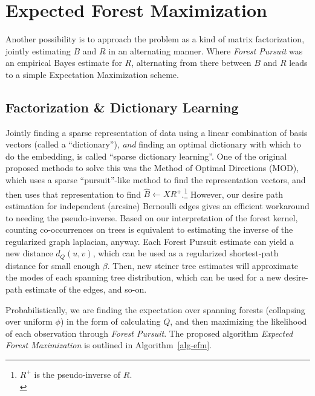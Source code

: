 \documentclass[%
	12pt,
		oneside,
		letterpaper
]{book}
\begin{document}
\section{Expected Forest Maximization}\label{expected-forest-maximization}

Another possibility is to approach the problem as a kind of matrix factorization, jointly estimating \(B\) and \(R\) in an alternating manner.
Where \emph{Forest Pursuit} was an empirical Bayes estimate for \(R\), alternating from there between \(B\) and \(R\) leads to a simple Expectation Maximization scheme.

\subsection{Factorization \& Dictionary Learning}\label{factorization-dictionary-learning}

Jointly finding a sparse representation of data using a linear combination of basis vectors (called a ``dictionary''), \emph{and} finding an optimal dictionary with which to do the embedding, is called ``sparse dictionary learning''.
One of the original proposed methods to solve this was the Method of Optimal Directions (MOD)\autocite{Methodoptimaldirections_Engan1999}, which uses a sparse ``pursuit''-like method to find the representation vectors, and then uses that representation to find \(\hat{B}\gets XR^+\).\footnote{
  \(R^+\) is the pseudo-inverse of \(R\).\\
}
However, our desire path estimation for independent (arcsine) Bernoulli edges gives an efficient workaround to needing the pseudo-inverse.
Based on our interpretation of the forest kernel, counting co-occurrences on trees is equivalent to estimating the inverse of the regularized graph laplacian, anyway.
Each Forest Pursuit estimate can yield a new distance \(d_Q(u,v)\), which can be used as a regularized shortest-path distance for small enough \(\beta\).
Then, new steiner tree estimates will approximate the modes of each spanning tree distribution, which can be used for a new desire-path estimate of the edges, and so-on.

Probabilistically, we are finding the expectation over spanning forests (collapsing over uniform \(\phi\)) in the form of calculating \(Q\), and then maximizing the likelihood of each observation through \emph{Forest Pursuit}.
The proposed algorithm \emph{Expected Forest Maximization} is outlined in Algorithm~\ref{alg-efm}.
\end{document}
